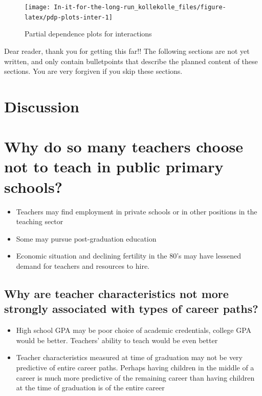 \documentclass[
]{article}
\begin{document}
\begin{figure}[H]
\texttt{[image: In-it-for-the-long-run\_kollekolle\_files/figure-latex/pdp-plots-inter-1]} \caption{Partial dependence plots for interactions}\label{fig:pdp-plots-inter}
\end{figure}

Dear reader, thank you for getting this far!! The following sections are not yet written, and only contain bulletpoints that describe the planned content of these sections. You are very forgiven if you skip these sections.

\hypertarget{discussion}{%
\section{Discussion}\label{discussion}}

\hypertarget{why-do-so-many-teachers-choose-not-to-teach-in-public-primary-schools}{%
\section{Why do so many teachers choose not to teach in public primary schools?}\label{why-do-so-many-teachers-choose-not-to-teach-in-public-primary-schools}}

\begin{itemize}
\item
  Teachers may find employment in private schools or in other positions in the teaching sector
\item
  Some may pursue post-graduation education
\item
  Economic situation and declining fertility in the 80's may have lessened demand for teachers and resources to hire.
\end{itemize}

\hypertarget{why-are-teacher-characteristics-not-more-strongly-associated-with-types-of-career-paths}{%
\subsection{Why are teacher characteristics not more strongly associated with types of career paths?}\label{why-are-teacher-characteristics-not-more-strongly-associated-with-types-of-career-paths}}

\begin{itemize}
\item
  High school GPA may be poor choice of academic credentials, college GPA would be better. Teachers' ability to teach would be even better
\item
  Teacher characteristics measured at time of graduation may not be very predictive of entire career paths. Perhaps having children in the middle of a career is much more predictive of the remaining career than having children at the time of graduation is of the entire career
\end{itemize}
\end{document}
